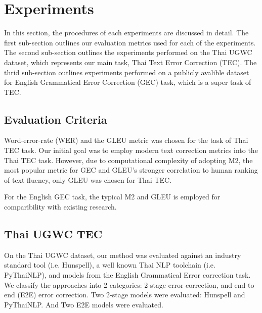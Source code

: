 \section{Experiments}

In this section, the procedures of each experiments are discussed in detail. The first sub-section outlines our evaluation metrics used for each of the experiments. The second sub-section outlines the experiments performed on the Thai UGWC dataset, which represents our main task, Thai Text Error Correction (TEC). The thrid sub-section outlines experiments performed on a publicly avalible dataset for English Grammatical Error Correction (GEC) task, which is a super task of TEC.


\subsection{Evaluation Criteria}

Word-error-rate (WER) and the GLEU metric was chosen for the task of Thai TEC task. Our initial goal was to employ modern text correction metrics into the Thai TEC task. However, due to computational complexity of adopting M2, the most popular metric for GEC and GLEU's stronger correlation to human ranking of text fluency, only GLEU was chosen for Thai TEC.

For the English GEC task, the typical M2 and GLEU is employed for comparibility with existing research.

\subsection{Thai UGWC TEC}

On the Thai UGWC dataset, our method was evaluated against an industry standard tool (i.e. Hunspell), a well known Thai NLP toolchain (i.e. PyThaiNLP), and models from the English Grammatical Error correction task. We classify the approaches into 2 categories: 2-stage error correction, and end-to-end (E2E) error correction. Two 2-stage models were evaluated: Hunspell and PyThaiNLP. And Two E2E models were evaluated.


